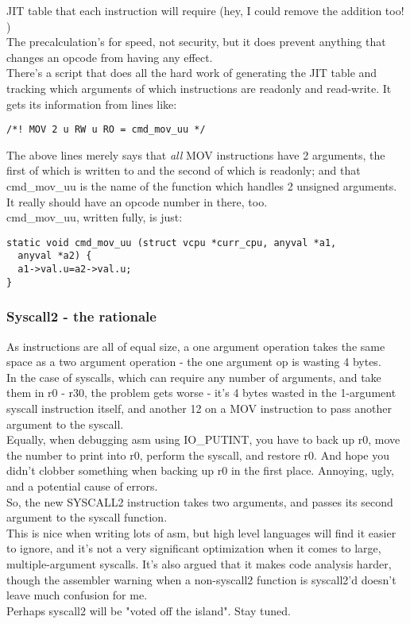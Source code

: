 \documentclass[a4paper,oneside,openany]{book}
\begin{document}
JIT table that each instruction will require (hey, I could remove the addition
too! \FIXME)\smallskip\\
The precalculation's for speed, not security, but it does prevent anything that
changes an opcode from having any effect.\smallskip\\
There's a script that does all the hard work of generating the JIT table and
tracking which arguments of which instructions are readonly and read-write. It
gets its information from lines like:
\begin{verbatim}
/*! MOV 2 u RW u RO = cmd_mov_uu */
\end{verbatim}
The above lines merely says that \emph{all} MOV instructions have 2 arguments,
the first of which is written to and the second of which is readonly; and that
cmd\_mov\_uu is the name of the function which handles 2 unsigned arguments.\smallskip\\
It really should have an opcode number in there, too. \FIXME\smallskip\\
cmd\_mov\_uu, written fully, is just:
\begin{verbatim}
static void cmd_mov_uu (struct vcpu *curr_cpu, anyval *a1,
  anyval *a2) {
  a1->val.u=a2->val.u;
}
\end{verbatim}
\subsubsection{Syscall2 - the rationale}
As instructions are all of equal size, a one argument operation takes the same
space as a two argument operation - the one argument op is wasting 4 bytes.
\smallskip\\
In the case of syscalls, which can require any number of arguments, and take
them in r0 - r30, the problem gets worse - it's 4 bytes wasted in the 1-argument
syscall instruction itself, and another 12 on a MOV instruction to pass another
argument to the syscall.\smallskip\\
Equally, when debugging asm using IO\_PUTINT, you have to back up r0, move the
number to print into r0, perform the syscall, and restore r0. And hope you
didn't clobber something when backing up r0 in the first place. Annoying, ugly,
and a potential cause of errors.\smallskip\\
So, the new SYSCALL2 instruction takes two arguments, and passes its second
argument to the syscall function.\smallskip\\
This is nice when writing lots of asm, but high level languages will find it
easier to ignore, and it's not a very significant optimization when it comes
to large, multiple-argument syscalls. It's also argued that it makes code
analysis harder, though the assembler warning when a non-syscall2 function is
syscall2'd doesn't leave much confusion for me.\smallskip\\
Perhaps syscall2 will be "voted off the island". Stay tuned.
\end{document}

